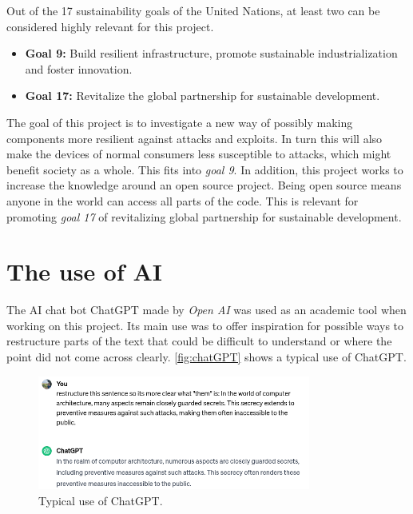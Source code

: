 Out of the 17 sustainability goals of the United Nations\cite{un}, at least two can be considered highly relevant for this project. 

\begin{itemize}
    \item \textbf{Goal 9:} Build resilient infrastructure, promote sustainable industrialization and foster innovation.
    \item \textbf{Goal 17:} Revitalize the global partnership for sustainable development.
\end{itemize}

The goal of this project is to investigate a new way of possibly making components more resilient against attacks and exploits. In turn this will also make the devices of normal consumers less susceptible to attacks, which might benefit society as a whole. This fits into \textit{goal 9}. In addition, this project works to increase the knowledge around an open source project. Being open source means anyone in the world can access all parts of the code. This is relevant for promoting \textit{goal 17} of revitalizing global partnership for sustainable development. 

\section{The use of AI}
\label{sec:AI}

The AI chat bot ChatGPT made by \textit{Open AI}\cite{chat} was used as an academic tool when working on this project. Its main use was to offer inspiration for possible ways to restructure parts of the text that could be difficult to understand or where the point did not come across clearly. \autoref{fig:chatGPT} shows a typical use of ChatGPT.

\begin{figure}[h!]
    \centering
    \includegraphics[width=0.8\textwidth]{docs/images/chat_gpt_use.png}
    \caption{Typical use of ChatGPT.}
    \label{fig:chatGPT}
\end{figure}

